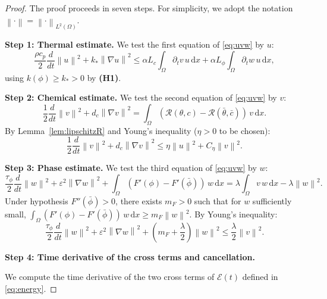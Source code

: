 \documentclass[10pt,a4paper]{amsart}
\newcommand{\dx}{\,\mathrm{d}x}
\newcommand{\norm}[1]{\left\|#1\right\|}
\newcommand{\ptn}{\partial_t}
\begin{document}
	\begin{proof}
		The proof proceeds in seven steps. For simplicity, we adopt the notation $\norm{\cdot} = \norm{\cdot}_{L^2(\Omega)}$.
		
		\medskip
		\textbf{Step 1: Thermal estimate.}
		We test the first equation of \eqref{eq:uvw} by $u$:
		\begin{equation}
			\label{eq3}
			\frac{\rho c_p}{2}\frac{d}{dt}\norm{u}^2 + k_*\norm{\nabla u}^2
			\leq \alpha L_c \int_\Omega \ptn v\,u\dx + \alpha L_\phi \int_\Omega \ptn w\,u\dx,
		\end{equation}
		using $k(\phi) \geq k_* > 0$ by \textbf{(H1)}.
		
		\medskip
		\textbf{Step 2: Chemical estimate.}
		We test the second equation of \eqref{eq:uvw} by $v$:
		\[
		\frac12\frac{d}{dt}\norm{v}^2 + d_c\norm{\nabla v}^2
		= \int_\Omega (\mathcal{R}(\theta,c) - \mathcal{R}(\bar\theta,\bar c))\,v\dx.
		\]
		By Lemma~\ref{lem:lipschitzR} and Young's inequality ($\eta > 0$ to be chosen):
		\begin{equation}
			\label{eq:v-est}
			\frac12\frac{d}{dt}\norm{v}^2 + d_c\norm{\nabla v}^2
			\leq \eta\norm{u}^2 + C_\eta\norm{v}^2.
		\end{equation}
		
		\medskip
		\textbf{Step 3: Phase estimate.}
		We test the third equation of \eqref{eq:uvw} by $w$:
		\[
		\frac{\tau_\phi}{2}\frac{d}{dt}\norm{w}^2 + \varepsilon^2\norm{\nabla w}^2
		+ \int_\Omega (F'(\phi)-F'(\bar\phi))\,w\dx
		= \lambda\int_\Omega v\,w\dx - \lambda\norm{w}^2.
		\]
		Under hypothesis $F''(\bar\phi) > 0$, there exists $m_F > 0$ such that for $w$ sufficiently small,
		$\int_\Omega (F'(\phi)-F'(\bar\phi))\,w\dx \geq m_F\norm{w}^2$. By Young's inequality:
		\begin{equation}
			\label{eq:w-est}
			\frac{\tau_\phi}{2}\frac{d}{dt}\norm{w}^2 + \varepsilon^2\norm{\nabla w}^2
			+ \left(m_F + \frac\lambda2\right)\norm{w}^2
			\leq \frac\lambda2\norm{v}^2.
		\end{equation}
		
		\medskip
		\noindent\textbf{Step 4: Time derivative of the cross terms and cancellation.}
		
		We compute the time derivative of the two cross terms of
		$\mathcal{E}(t)$ defined in \eqref{eq:energy}.
		

\end{proof}
\end{document}
